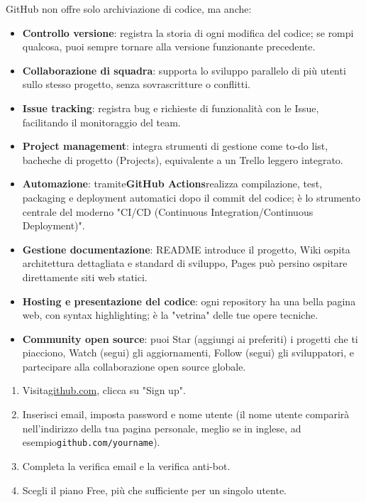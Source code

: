 
GitHub non offre solo archiviazione di codice, ma anche:

\begin{itemize}
  \item \textbf{Controllo versione}: registra la storia di ogni modifica del codice; se rompi qualcosa, puoi sempre tornare alla versione funzionante precedente.
  \item \textbf{Collaborazione di squadra}: supporta lo sviluppo parallelo di più utenti sullo stesso progetto, senza sovrascritture o conflitti.
  \item \textbf{Issue tracking}: registra bug e richieste di funzionalità con le Issue, facilitando il monitoraggio del team.
  \item \textbf{Project management}: integra strumenti di gestione come to-do list, bacheche di progetto (Projects), equivalente a un Trello leggero integrato.
  \item \textbf{Automazione}: tramite\textbf{GitHub Actions}realizza compilazione, test, packaging e deployment automatici dopo il commit del codice; è lo strumento centrale del moderno "CI/CD (Continuous Integration/Continuous Deployment)".
  \item \textbf{Gestione documentazione}: README introduce il progetto, Wiki ospita architettura dettagliata e standard di sviluppo, Pages può persino ospitare direttamente siti web statici.
  \item \textbf{Hosting e presentazione del codice}: ogni repository ha una bella pagina web, con syntax highlighting; è la "vetrina" delle tue opere tecniche.
  \item \textbf{Community open source}: puoi Star (aggiungi ai preferiti) i progetti che ti piacciono, Watch (segui) gli aggiornamenti, Follow (segui) gli sviluppatori, e partecipare alla collaborazione open source globale.
\end{itemize}



\begin{enumerate}
  \item Visita\href{https://github.com}{github.com}, clicca su "Sign up".
  \item Inserisci email, imposta password e nome utente (il nome utente comparirà nell'indirizzo della tua pagina personale, meglio se in inglese, ad esempio\texttt{github.\allowbreak com/\allowbreak yourname}).
  \item Completa la verifica email e la verifica anti-bot.
  \item Scegli il piano Free, più che sufficiente per un singolo utente.
\end{enumerate}

